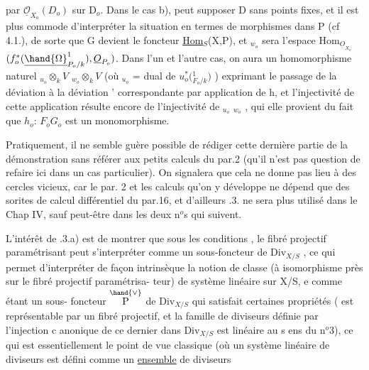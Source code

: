 
par $\underline{\mathcal{O}}_{X_o}(D_o)$ sur D$_o$. Dans le cas b),  peut supposer D sans points
fixes, et il est plus commode d'interpréter la situation en termes de
morphismes dans P (cf 4.1.), de sorte que G devient le foncteur
\underline{Hom}$_S$(X,P), et $_{w_o}$ sera l'espace  Hom$_{\underline{O}_{X_o}}$$(f_o^{*}(\underline{\hand{\Omega}}^{1}_{P_o/k}), \underline{O}_{P_o})$.
Dans l'un et l'autre cas, on aura un homomorphisme naturel
$_{u_o}\otimes_k V$ \hand{$\to$} $_{w_o}\otimes_k V$ (où $_{u_o}$ = dual de $u_o^{*}($\hand{$\Omega$}$^{1}_{F_o/k})$ ) exprimant le passage
de la déviation \hand{$\delta$} à la déviation \hand{$\delta$}' correspondante par application de h,
et l'injectivité de cette application résulte encore de l'injectivité
de $_{u_o}$\hand{$\to$} $_{w_o}$ , qui elle provient du fait que $h_o$: $F_o$\hand{$\to$}$G_o$ est un
monomorphisme.
\placedmargin{$/$}

Pratiquement, il ne semble guère possible de rédiger cette dernière
partie de la démonstration sans référer aux petits calculs du par.2
(qu'il n'est pas question de refaire ici dans un cas particulier). On
signalera que cela ne donne pas lieu à des cercles vicieux, car le par.
2  et les calculs qu'on y  développe ne dépend que des sorites
de calcul différentiel du par.16, et d'ailleurs .3. ne sera plus
utilisé dans le Chap IV, sauf peut-être dans les deux n$^{o}$s qui suivent.

L'intérêt de .3.a) est de montrer que sous les conditions ,
le fibré projectif paramétrisant peut s'interpréter comme un sous-foncteur
de Div$_{X/S}$ , ce qui permet d'interpréter de façon intrinsèque la notion
de classe (à isomorphisme près sur le  fibré projectif paramétrisa-%
teur) de système linéaire sur X/S, e comme étant un sous-
foncteur $\overset{\hand{\vee}}{\text{P}}$ de Div$_{X/S}$ qui satisfait certaines propriétés ( est
représentable par un fibré projectif, et la famille de diviseurs définie
par l'injection c anonique de ce dernier dans Div$_{X/S}$ est linéaire au s ens
du n$^{o}$3), ce qui est essentiellement le point de vue classique (où un
système linéaire de diviseurs est défini comme un \uline{ensemble} de diviseurs

